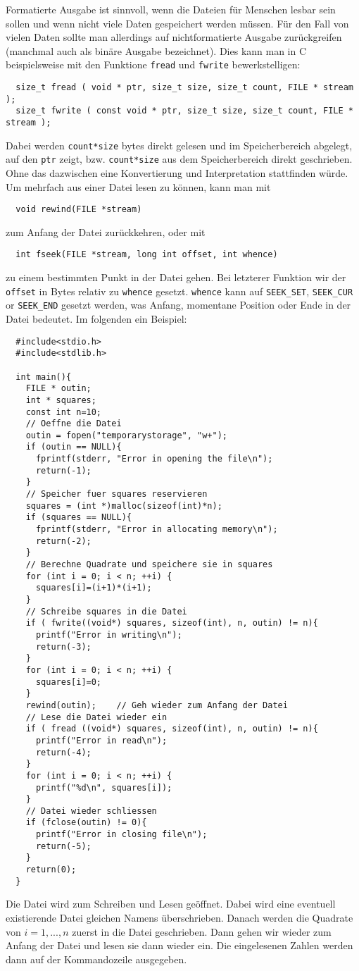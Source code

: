 Formatierte Ausgabe ist sinnvoll, wenn die Dateien für Menschen lesbar sein sollen und wenn nicht viele Daten gespeichert werden müssen.
Für den Fall von vielen Daten sollte man allerdings auf nichtformatierte Ausgabe zurückgreifen (manchmal auch als binäre Ausgabe bezeichnet).
Dies kann man in C beispielsweise mit den Funktione \texttt{fread} und \texttt{fwrite} bewerkstelligen:
\begin{lstlisting}
  size_t fread ( void * ptr, size_t size, size_t count, FILE * stream );
  size_t fwrite ( const void * ptr, size_t size, size_t count, FILE * stream );
\end{lstlisting}
Dabei werden \verb|count*size| bytes direkt gelesen und im Speicherbereich abgelegt, auf den \verb|ptr| zeigt, bzw. \verb|count*size| aus dem Speicherbereich direkt geschrieben.
Ohne das dazwischen eine Konvertierung und Interpretation stattfinden würde.
Um mehrfach aus einer Datei lesen zu können, kann man mit 
\begin{lstlisting}
  void rewind(FILE *stream)
\end{lstlisting}
zum Anfang der Datei zurückkehren, oder mit
\begin{lstlisting}
  int fseek(FILE *stream, long int offset, int whence)
\end{lstlisting}
zu einem bestimmten Punkt in der Datei gehen.
Bei letzterer Funktion wir der \verb|offset| in Bytes relativ zu \verb|whence| gesetzt.
\verb|whence| kann auf \verb|SEEK_SET|, \verb|SEEK_CUR| or \verb|SEEK_END| gesetzt werden, was Anfang, momentane Position oder Ende in der Datei bedeutet.
Im folgenden ein Beispiel:
\begin{lstlisting}
  #include<stdio.h>
  #include<stdlib.h>

  int main(){
    FILE * outin;
    int * squares;
    const int n=10;
    // Oeffne die Datei
    outin = fopen("temporarystorage", "w+");
    if (outin == NULL){
      fprintf(stderr, "Error in opening the file\n");
      return(-1);
    }
    // Speicher fuer squares reservieren
    squares = (int *)malloc(sizeof(int)*n);
    if (squares == NULL){
      fprintf(stderr, "Error in allocating memory\n");
      return(-2);
    }
    // Berechne Quadrate und speichere sie in squares
    for (int i = 0; i < n; ++i) {
      squares[i]=(i+1)*(i+1);
    }
    // Schreibe squares in die Datei
    if ( fwrite((void*) squares, sizeof(int), n, outin) != n){
      printf("Error in writing\n");
      return(-3);
    }
    for (int i = 0; i < n; ++i) {
      squares[i]=0;
    }
    rewind(outin);    // Geh wieder zum Anfang der Datei
    // Lese die Datei wieder ein
    if ( fread ((void*) squares, sizeof(int), n, outin) != n){
      printf("Error in read\n");
      return(-4);
    }
    for (int i = 0; i < n; ++i) {
      printf("%d\n", squares[i]);
    }
    // Datei wieder schliessen
    if (fclose(outin) != 0){
      printf("Error in closing file\n");
      return(-5);
    }
    return(0);
  }   
\end{lstlisting}
Die Datei wird zum Schreiben und Lesen geöffnet.
Dabei wird eine eventuell existierende Datei gleichen Namens überschrieben.
Danach werden die Quadrate von $i=1,...,n$ zuerst in die Datei geschrieben.
Dann gehen wir wieder zum Anfang der Datei und lesen sie dann wieder ein.
Die eingelesenen Zahlen werden dann auf der Kommandozeile ausgegeben.
